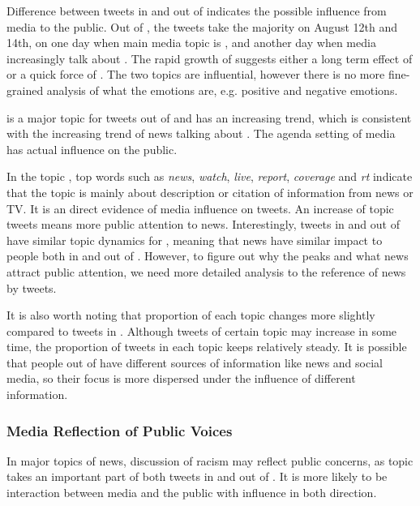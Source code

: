 Difference between tweets in and out of \stlouis indicates the possible influence from media to the public. Out of \stlouis, the \emotion tweets take the majority on August 12th and 14th, on one day when main media topic is \shootincident, and another day when media increasingly talk about \obamatalk. The rapid growth of \emotion suggests either a long term effect of \shootincident or a quick force of \obamatalk. The two topics are influential, however there is no more fine-grained analysis of what the emotions are, e.g. positive and negative emotions.

\racism is a major topic for tweets out of \stlouis and has an increasing trend, which is consistent with the increasing trend of news talking about \raceandcommunity. The agenda setting of media has actual influence on the public.

In the topic \newsreport, top words such as \emph{news}, \emph{watch}, \emph{live}, \emph{report}, \emph{coverage} and \emph{rt} indicate that the topic is mainly about description or citation of information from news or TV. It is an direct evidence of media influence on tweets. An increase of \newsreport topic tweets means more public attention to news. Interestingly, tweets in and out of \stlouis have similar topic dynamics for \newsreport, meaning that news have similar impact to people both in and out of \stlouis. However, to figure out why the peaks and what news attract public attention, we need more detailed analysis to the reference of news by tweets.

It is also worth noting that proportion of each topic changes more slightly compared to tweets in \stlouis. Although tweets of certain topic may increase in some time, the proportion of tweets in each topic keeps relatively steady. It is possible that people out of \stlouis have different sources of information like news and social media, so their focus is more dispersed under the influence of different information.

\subsubsection{Media Reflection of Public Voices}
In major topics of news, discussion of racism may reflect public concerns, as topic \racism takes an important part of both tweets in and out of \stlouis. It is more likely to be interaction between media and the public with influence in both direction.

